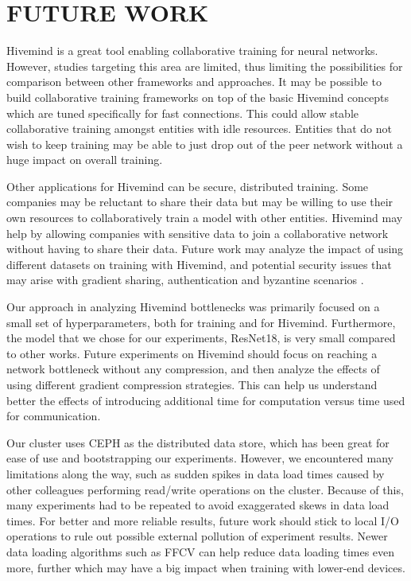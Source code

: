 \chapter{FUTURE WORK}\label{chapter:future-work}

Hivemind is a great tool enabling collaborative training for neural networks.
However, studies targeting this area are limited, thus limiting the possibilities for comparison between other frameworks and approaches.
It may be possible to build collaborative training frameworks on top of the basic Hivemind concepts which are tuned specifically for fast connections.
This could allow stable collaborative training amongst entities with idle resources.
Entities that do not wish to keep training may be able to just drop out of the peer network without a huge impact on overall training.

Other applications for Hivemind can be secure, distributed training.
Some companies may be reluctant to share their data but may be willing to use their own resources to collaboratively train a model with other entities.
Hivemind may help by allowing companies with sensitive data to join a collaborative network without having to share their data.
Future work may analyze the impact of using different datasets on training with Hivemind, and potential security issues that may arise with gradient sharing, authentication and byzantine scenarios \cite{DBLP:journals/corr/abs-2106-11257}.

Our approach in analyzing Hivemind bottlenecks was primarily focused on a small set of hyperparameters, both for training and for Hivemind.
Furthermore, the model that we chose for our experiments, ResNet18, is very small compared to other works.
Future experiments on Hivemind should focus on reaching a network bottleneck without any compression, and then analyze the effects of using different gradient compression strategies.
This can help us understand better the effects of introducing additional time for computation versus time used for communication.

Our cluster uses CEPH as the distributed data store, which has been great for ease of use and bootstrapping our experiments.
However, we encountered many limitations along the way, such as sudden spikes in data load times caused by other colleagues performing read/write operations on the cluster.
Because of this, many experiments had to be repeated to avoid exaggerated skews in data load times.
For better and more reliable results, future work should stick to local I/O operations to rule out possible external pollution of experiment results.
Newer data loading algorithms such as FFCV \cite{leclerc2022ffcv} can help reduce data loading times even more, further which may have a big impact when training with lower-end devices.

